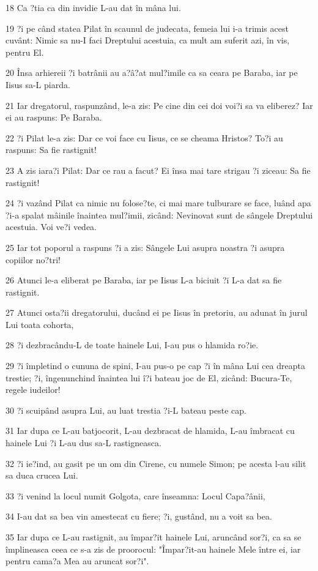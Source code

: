\par 18 Ca ?tia ca din invidie L-au dat în mâna lui.
\par 19 ?i pe când statea Pilat în scaunul de judecata, femeia lui i-a trimis acest cuvânt: Nimic sa nu-I faci Dreptului acestuia, ca mult am suferit azi, în vis, pentru El.
\par 20 Însa arhiereii ?i batrânii au a?â?at mul?imile ca sa ceara pe Baraba, iar pe Iisus sa-L piarda.
\par 21 Iar dregatorul, raspunzând, le-a zis: Pe cine din cei doi voi?i sa va eliberez? Iar ei au raspuns: Pe Baraba.
\par 22 ?i Pilat le-a zis: Dar ce voi face cu Iisus, ce se cheama Hristos? To?i au raspuns: Sa fie rastignit!
\par 23 A zis iara?i Pilat: Dar ce rau a facut? Ei însa mai tare strigau ?i ziceau: Sa fie rastignit!
\par 24 ?i vazând Pilat ca nimic nu folose?te, ci mai mare tulburare se face, luând apa ?i-a spalat mâinile înaintea mul?imii, zicând: Nevinovat sunt de sângele Dreptului acestuia. Voi ve?i vedea.
\par 25 Iar tot poporul a raspuns ?i a zis: Sângele Lui asupra noastra ?i asupra copiilor no?tri!
\par 26 Atunci le-a eliberat pe Baraba, iar pe Iisus L-a biciuit ?i L-a dat sa fie rastignit.
\par 27 Atunci osta?ii dregatorului, ducând ei pe Iisus în pretoriu, au adunat în jurul Lui toata cohorta,
\par 28 ?i dezbracându-L de toate hainele Lui, I-au pus o hlamida ro?ie.
\par 29 ?i împletind o cununa de spini, I-au pus-o pe cap ?i în mâna Lui cea dreapta trestie; ?i, îngenunchind înaintea lui î?i bateau joc de El, zicând: Bucura-Te, regele iudeilor!
\par 30 ?i scuipând asupra Lui, au luat trestia ?i-L bateau peste cap.
\par 31 Iar dupa ce L-au batjocorit, L-au dezbracat de hlamida, L-au îmbracat cu hainele Lui ?i L-au dus sa-L rastigneasca.
\par 32 ?i ie?ind, au gasit pe un om din Cirene, cu numele Simon; pe acesta l-au silit sa duca crucea Lui.
\par 33 ?i venind la locul numit Golgota, care înseamna: Locul Capa?ânii,
\par 34 I-au dat sa bea vin amestecat cu fiere; ?i, gustând, nu a voit sa bea.
\par 35 Iar dupa ce L-au rastignit, au împar?it hainele Lui, aruncând sor?i, ca sa se împlineasca ceea ce s-a zis de proorocul: "Împar?it-au hainele Mele între ei, iar pentru cama?a Mea au aruncat sor?i".
